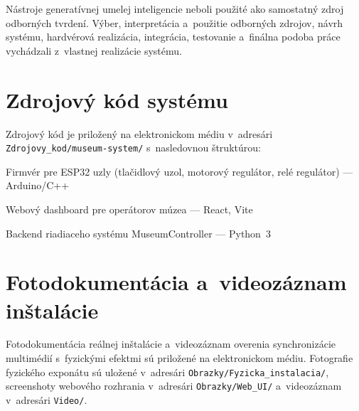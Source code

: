 Nástroje generatívnej umelej inteligencie neboli použité ako samostatný
zdroj odborných tvrdení. Výber, interpretácia a~použitie odborných zdrojov,
návrh systému, hardvérová realizácia, integrácia, testovanie a~finálna
podoba práce vychádzali z~vlastnej realizácie systému.


\chapter{Zdrojový kód systému}
\label{priloha:zdrojovy-kod}

Zdrojový kód je priložený na elektronickom médiu v~adresári
\texttt{Zdrojovy\_kod/museum-system/} s~nasledovnou štruktúrou:

\begin{description}[leftmargin=4cm, labelwidth=4cm, labelsep=1em]
    \item[\texttt{esp32/}] Firmvér pre ESP32 uzly (tlačidlový uzol,
        motorový regulátor, relé regulátor) --- Arduino/C++
    \item[\texttt{frontend/}] Webový dashboard pre operátorov múzea --- React, Vite
    \item[\texttt{raspberry\_pi/}] Backend riadiaceho systému MuseumController --- Python~3
\end{description}


\chapter{Fotodokumentácia a~videozáznam inštalácie}
\label{priloha:foto}

Fotodokumentácia reálnej inštalácie a~videozáznam overenia synchronizácie
multimédií s~fyzickými efektmi sú priložené na elektronickom médiu.
Fotografie fyzického exponátu sú uložené v~adresári
\texttt{Obrazky/Fyzicka\_instalacia/}, screenshoty webového rozhrania
v~adresári \texttt{Obrazky/Web\_UI/} a~videozáznam v~adresári
\texttt{Video/}.
